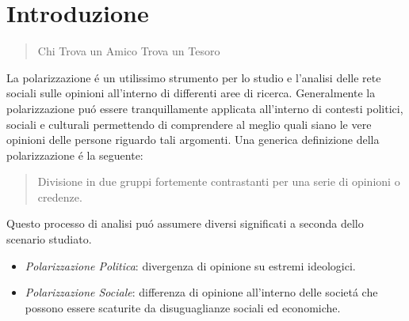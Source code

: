 \chapter{Introduzione}
\label{Introduzione}
\thispagestyle{empty}

\begin{quotation}
{\footnotesize
{}
\begin{flushright}
Chi Trova un Amico Trova un Tesoro
\end{flushright}
}
\end{quotation}
\vspace{0.5cm}

\noindent %

La polarizzazione \'e un utilissimo strumento per lo studio e l'analisi delle rete sociali sulle opinioni all'interno di differenti aree di ricerca. Generalmente la polarizzazione pu\'o essere tranquillamente applicata all'interno di contesti politici, sociali e culturali permettendo di comprendere al meglio quali siano le vere opinioni delle persone riguardo tali argomenti. Una generica definizione della polarizzazione \'e la seguente:
\begin{quote} 
Divisione in due gruppi fortemente contrastanti per una serie di opinioni o credenze.
\end{quote}
Questo processo di analisi pu\'o assumere diversi significati a seconda dello scenario studiato. 
\begin{itemize}
\item \textit{Polarizzazione Politica}: divergenza di opinione su estremi ideologici.
\item \textit{Polarizzazione Sociale}: differenza di opinione all'interno delle societ\'a che possono essere scaturite da disuguaglianze sociali ed economiche.

\end{itemize}

